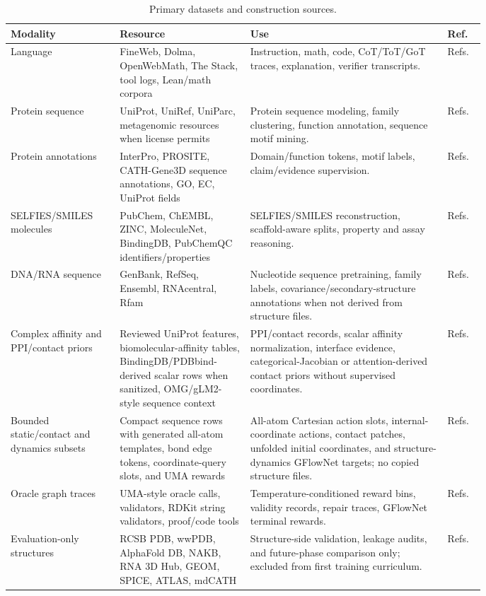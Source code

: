 \documentclass[11pt]{article}
\newcommand{\1}{\mathbf{1}}
\begin{document}
{\scriptsize
\setlength{\tabcolsep}{2pt}
\begin{longtable}{p{0.16\linewidth}p{0.22\linewidth}p{0.34\linewidth}p{0.06\linewidth}}
\caption{Primary datasets and construction sources.}\\
\toprule
Modality & Resource & Use & Ref. \\
\midrule
\endhead
Language & FineWeb, Dolma, OpenWebMath, The Stack, tool logs, Lean/math corpora & Instruction, math, code, CoT/ToT/GoT traces, explanation, verifier transcripts. & Refs. \\
Protein sequence & UniProt, UniRef, UniParc, metagenomic resources when license permits & Protein sequence modeling, family clustering, function annotation, sequence motif mining. & Refs. \\
Protein annotations & InterPro, PROSITE, CATH-Gene3D sequence annotations, GO, EC, UniProt fields & Domain/function tokens, motif labels, claim/evidence supervision. & Refs. \\
SELFIES/SMILES molecules & PubChem, ChEMBL, ZINC, MoleculeNet, BindingDB, PubChemQC identifiers/properties & SELFIES/SMILES reconstruction, scaffold-aware splits, property and assay reasoning. & Refs. \\
DNA/RNA sequence & GenBank, RefSeq, Ensembl, RNAcentral, Rfam & Nucleotide sequence pretraining, family labels, covariance/secondary-structure annotations when not derived from structure files. & Refs. \\
Complex affinity and PPI/contact priors & Reviewed UniProt features, biomolecular-affinity tables, BindingDB/PDBbind-derived scalar rows when sanitized, OMG/gLM2-style sequence context & PPI/contact records, scalar affinity normalization, interface evidence, categorical-Jacobian or attention-derived contact priors without supervised coordinates. & Refs. \\
Bounded static/contact and dynamics subsets & Compact sequence rows with generated all-atom templates, bond edge tokens, coordinate-query slots, and UMA rewards & All-atom Cartesian action slots, internal-coordinate actions, contact patches, unfolded initial coordinates, and structure-dynamics GFlowNet targets; no copied structure files. & Refs. \\
Oracle graph traces & UMA-style oracle calls, validators, RDKit string validators, proof/code tools & Temperature-conditioned reward bins, validity records, repair traces, GFlowNet terminal rewards. & Refs. \\
Evaluation-only structures & RCSB PDB, wwPDB, AlphaFold DB, NAKB, RNA 3D Hub, GEOM, SPICE, ATLAS, mdCATH & Structure-side validation, leakage audits, and future-phase comparison only; excluded from first training curriculum. & Refs. \\
\bottomrule
\end{longtable}}
\end{document}
